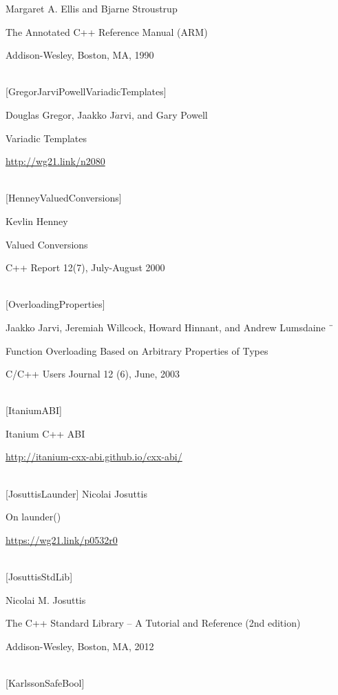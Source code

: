 Margaret A. Ellis and Bjarne Stroustrup

The Annotated C++ Reference Manual (ARM)

Addison-Wesley, Boston, MA, 1990

\hspace*{\fill} \\ %
{[GregorJarviPowellVariadicTemplates]}

Douglas Gregor, Jaakko J$\ddot{a}$rvi, and Gary Powell 

Variadic Templates

\url{http://wg21.link/n2080}

\hspace*{\fill} \\ %
{[HenneyValuedConversions]}

Kevlin Henney

Valued Conversions

C++ Report 12(7), July-August 2000

\hspace*{\fill} \\ %
{[OverloadingProperties]}

Jaakko Jarvi, Jeremiah Willcock, Howard Hinnant, and Andrew Lumsdaine ¨

Function Overloading Based on Arbitrary Properties of Types

C/C++ Users Journal 12 (6), June, 2003

\hspace*{\fill} \\ %
{[ItaniumABI]}

Itanium C++ ABI

\url{http://itanium-cxx-abi.github.io/cxx-abi/}

\hspace*{\fill} \\ %
{[JosuttisLaunder]}
Nicolai Josuttis

On launder()

\url{https://wg21.link/p0532r0}

\hspace*{\fill} \\ %
{[JosuttisStdLib]}

Nicolai M. Josuttis

The C++ Standard Library – A Tutorial and Reference (2nd edition)

Addison-Wesley, Boston, MA, 2012

\hspace*{\fill} \\ %
{[KarlssonSafeBool]}

